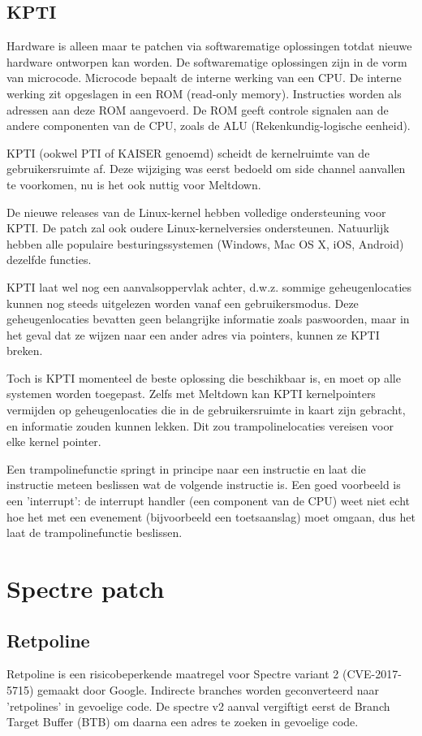 \subsection{KPTI}
Hardware is alleen maar te patchen via softwarematige oplossingen totdat nieuwe hardware ontworpen kan worden.
De softwarematige oplossingen zijn in de vorm van microcode.
Microcode bepaalt de interne werking van een CPU.
De interne werking zit opgeslagen in een ROM (read-only memory).
Instructies worden als adressen aan deze ROM aangevoerd.
De ROM geeft controle signalen aan de andere componenten van de CPU, zoals de ALU (Rekenkundig-logische eenheid).

KPTI (ookwel PTI of KAISER genoemd) scheidt de kernelruimte van de gebruikersruimte af.
Deze wijziging was eerst bedoeld om side channel aanvallen te voorkomen, nu is het ook nuttig voor Meltdown.

De nieuwe releases van de Linux-kernel hebben volledige ondersteuning voor KPTI.
De patch zal ook oudere Linux-kernelversies ondersteunen. 
Natuurlijk hebben alle populaire besturingssystemen (Windows, Mac OS X, iOS, Android) dezelfde functies.

KPTI laat wel nog een aanvalsoppervlak achter, d.w.z. sommige geheugenlocaties kunnen nog steeds uitgelezen worden vanaf een gebruikersmodus. 
Deze geheugenlocaties bevatten geen belangrijke informatie zoals paswoorden, maar in het geval dat ze wijzen naar een ander adres via pointers, kunnen ze KPTI breken. 


Toch is KPTI momenteel de beste oplossing die beschikbaar is, en moet op alle systemen worden toegepast.
Zelfs met Meltdown kan KPTI kernelpointers
vermijden op geheugenlocaties
die in de gebruikersruimte in kaart zijn gebracht, en informatie zouden kunnen lekken. Dit zou 
trampolinelocaties vereisen voor elke kernel pointer.

Een trampolinefunctie springt in principe naar een instructie en laat die instructie meteen beslissen wat de volgende instructie is.
Een goed voorbeeld is een 'interrupt': de interrupt handler (een component van de CPU) weet niet echt hoe het met een evenement (bijvoorbeeld een toetsaanslag) moet omgaan, dus het laat de trampolinefunctie beslissen.


\section{Spectre patch}
\subsection{Retpoline}
Retpoline is een risicobeperkende maatregel voor Spectre variant 2 (CVE-2017-5715) gemaakt door Google.
Indirecte branches worden geconverteerd naar 'retpolines' in gevoelige code.
De spectre v2 aanval vergiftigt eerst de Branch Target Buffer (BTB) om daarna een adres te zoeken in gevoelige code.

